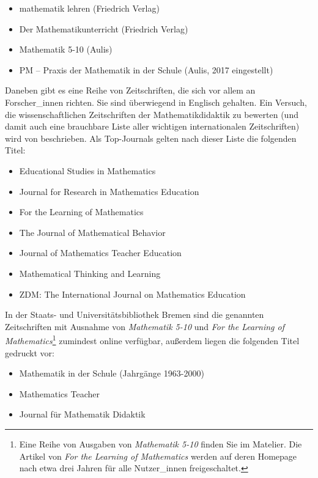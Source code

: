 \documentclass[
  bibliography=totoc,
  oneside,
  12pt,
  a4paper]{scrbook}
\begin{document}
\begin{itemize}
\item
  mathematik lehren (Friedrich Verlag)
\item
  Der Mathematikunterricht (Friedrich Verlag)
\item
  Mathematik 5-10 (Aulis)
\item
  PM -- Praxis der Mathematik in der Schule (Aulis, 2017 eingestellt)
\end{itemize}

Daneben gibt es eine Reihe von Zeitschriften, die sich vor allem an
Forscher\_innen richten. Sie sind überwiegend in Englisch gehalten. Ein
Versuch, die wissenschaftlichen Zeitschriften der Mathematikdidaktik zu
bewerten (und damit auch eine brauchbare Liste aller wichtigen
internationalen Zeitschriften) wird von \textcite{toerner2012} beschrieben. Als Top-Journals
gelten nach dieser Liste die folgenden Titel:

\begin{itemize}
\item
  Educational Studies in Mathematics
\item
  Journal for Research in Mathematics Education
\item
  For the Learning of Mathematics
\item
  The Journal of Mathematical Behavior
\item
  Journal of Mathematics Teacher Education
\item
  Mathematical Thinking and Learning
\item
  ZDM: The International Journal on Mathematics Education
\end{itemize}

In der Staats- und Universitätsbibliothek Bremen sind die genannten
Zeitschriften mit Ausnahme von \emph{Mathematik 5-10} und \emph{For the Learning of Mathematics}\footnote{Eine Reihe von Ausgaben von \emph{Mathematik 5-10} finden Sie im
  Matelier. Die Artikel von \emph{For the Learning of Mathematics} werden
  auf deren Homepage nach etwa drei Jahren für alle Nutzer\_innen
  freigeschaltet.} zumindest online verfügbar, außerdem liegen die
folgenden Titel gedruckt vor:

\begin{itemize}
\item
  Mathematik in der Schule (Jahrgänge 1963-2000)
\item
  Mathematics Teacher
\item
  Journal für Mathematik Didaktik
\end{itemize}
\end{document}
